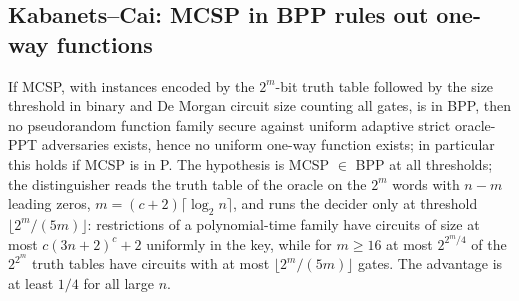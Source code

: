 \begin{result}
\subsection{Kabanets--Cai: MCSP in BPP rules out one-way functions}
If MCSP, with instances encoded by the $2^m$-bit truth table followed by the size
threshold in binary and De Morgan circuit size counting all gates, is in BPP, then
no pseudorandom function family secure against uniform adaptive strict oracle-PPT
adversaries exists, hence no uniform one-way function exists; in particular this
holds if MCSP is in P. The hypothesis is MCSP $\in$ BPP at all thresholds; the
distinguisher reads the truth table of the oracle on the $2^m$ words with $n-m$ leading
zeros, $m=(c+2)\lceil\log_2 n\rceil$, and runs the decider only at threshold
$\lfloor 2^m/(5m)\rfloor$: restrictions of a polynomial-time family have circuits of size
at most $c(3n+2)^c+2$ uniformly in the key, while for $m\ge16$ at most $2^{2^m/4}$ of the
$2^{2^m}$ truth tables have circuits with at most $\lfloor 2^m/(5m)\rfloor$ gates. The
advantage is at least $1/4$ for all large $n$.\citep{KabanetsCai2000,GGM1986}
\end{result}
